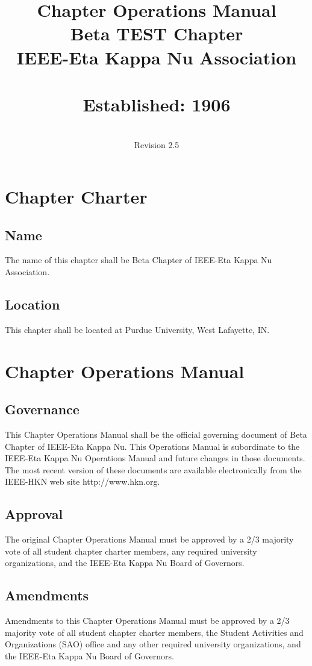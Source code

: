 \documentclass[10pt, oneside]{article}
\title{Chapter Operations Manual \\ Beta TEST Chapter \\ IEEE-Eta Kappa Nu Association \\~\\ Established: 1906}
\author{\\Revision 2.5}
\date{}
\renewcommand{\thesection}{ARTICLE \Roman{section}}
\begin{document}
\pagestyle{fancy}
\fancyhead[R]{}
\renewcommand{\sectionmark}[1]{\markright{\MakeUppercase{\thesection. \ #1}}{}}
\renewcommand{\subsectionmark}[1]{}


\maketitle
\thispagestyle{empty}
\clearpage
\setcounter{page}{1}

\tableofcontents
\clearpage

\section{Chapter Charter}
\subsection{Name}
The name of this chapter shall be Beta Chapter of IEEE-Eta Kappa Nu Association.
\subsection{Location}
This chapter shall be located at Purdue University, West Lafayette, IN.

\section{Chapter Operations Manual}
\subsection{Governance}
This Chapter Operations Manual shall be the official governing document of Beta Chapter of IEEE-Eta Kappa Nu. This Operations Manual is subordinate to the IEEE-Eta Kappa Nu Operations Manual and future changes in those documents. The most recent version of these documents are available electronically from the IEEE-HKN web site http://www.hkn.org.
\subsection{Approval}
The original Chapter Operations Manual must be approved by a 2/3 majority vote of all student chapter charter members, any required university organizations, and the IEEE-Eta Kappa Nu Board of Governors.
\subsection{Amendments}
Amendments to this Chapter Operations Manual must be approved by a 2/3 majority vote of all student chapter charter members, the Student Activities and Organizations (SAO) office and any other required university organizations, and the IEEE-Eta Kappa Nu Board of Governors.
\end{document}
